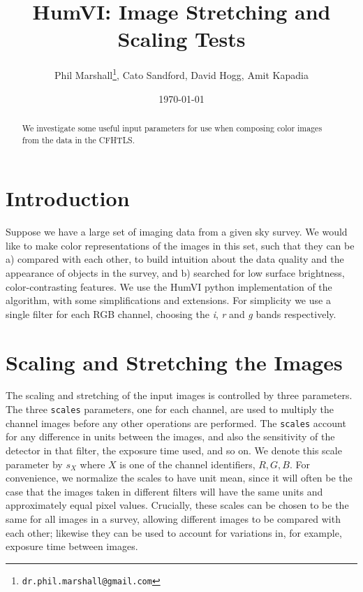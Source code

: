 \documentclass[letterpaper, 11pt]{article}
\title{HumVI: Image Stretching and Scaling Tests}
\author{Phil Marshall\thanks{\texttt{dr.phil.marshall@gmail.com}}, 
Cato Sandford, David Hogg, Amit Kapadia}
\date{\today}
\def\humvi{{\sc HumVI}\xspace}
\begin{document}
\maketitle
\vspace{1cm}


\begin{abstract}
We investigate some useful input parameters for
use when composing color images from the data in the CFHTLS.
\end{abstract}


\section{Introduction}
\label{sec:intro}

Suppose we have a large set of imaging data from a given sky survey. We would
like to make color representations of the images in this set, such that they
can be a) compared with each other, to build intuition about the data quality
and the appearance of objects in the survey, and b) searched for low surface
brightness, color-contrasting features. We use the \humvi python
implementation of the \citet[][hereafter L04]{Lup++04} algorithm, with some simplifications and
extensions. For simplicity we use a single filter for each RGB channel,
choosing the {\it i}, {\it r} and {\it g} bands respectively.

\section{Scaling and Stretching the Images}
\label{sec:stretch}

The scaling and stretching of the input images is controlled by three
parameters. The three \texttt{scales} parameters, one for each channel, are
used to multiply the channel images before any other operations are performed.
The \texttt{scales} account for any difference in units between the images,
and also the sensitivity of the detector in that filter, the exposure time
used, and so on. We denote this scale parameter by $s_{X}$ where $X$ is one of
the channel identifiers, $R,G,B$. For convenience, we normalize the scales to
have unit mean, since it will often be the case that the images taken in
different filters will have the same units and approximately equal pixel
values. Crucially, these scales can be chosen to be the same for all images in
a survey, allowing different images to be compared with each other; likewise
they can be used to account for variations in, for example, exposure time
between images.
\end{document}
